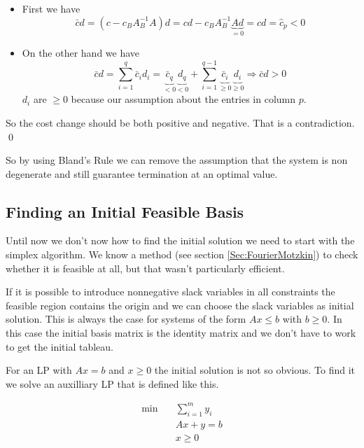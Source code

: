 \begin{pr}
\begin{itemize}
\item First we have 
\[\bar cd = (c - c_B A_B^{-1} A) d= cd - c_B A_B^{-1}\underbrace{Ad}_{=0} = cd = \hat c_p<0\]

\item On the other hand we have
\[\bar c d = \sum_{i=1}^{q} \bar c_i d_i = \underbrace{\bar c_q}_{<0}\underbrace{d_q}_{<0} + \sum _{i=1}^{q-1} \underbrace{\bar c_i}_{\geq 0}\underbrace{d_i}_{\geq 0} \Rightarrow \bar c d >0\]
$d_i$ are $\geq 0$ because our assumption about the entries in column $p$. %

\end{itemize}

So the cost change should be both positive and negative. That is a contradiction.
\qed \end{pr}

So by using Bland's Rule we can remove the assumption that the system is non degenerate and still guarantee termination at an optimal value.

\subsection{Finding an Initial Feasible Basis}

Until now we don't now how to find the initial solution we need to start with the simplex algorithm. We know a method (see section \ref{Sec:FourierMotzkin}) to check whether it is feasible at all, but that wasn't particularly efficient. 

If it is possible to introduce nonnegative slack variables in all constraints the feasible region contains the origin and we can choose the slack variables as initial solution. This is always the case for systems of the form $Ax\leq b$ with $b\geq 0$. In this case the initial basis matrix is the identity matrix and we don't have to work to get the initial tableau.

For an LP with $Ax=b$ and $x\geq 0$ the initial solution is not so obvious. To find it we solve an auxilliary LP that is defined like this.

\begin{align*}
\min \quad & \sum_{i=1}^m y_i\\
&Ax+y=b\\
&x\geq 0
\end{align*}


